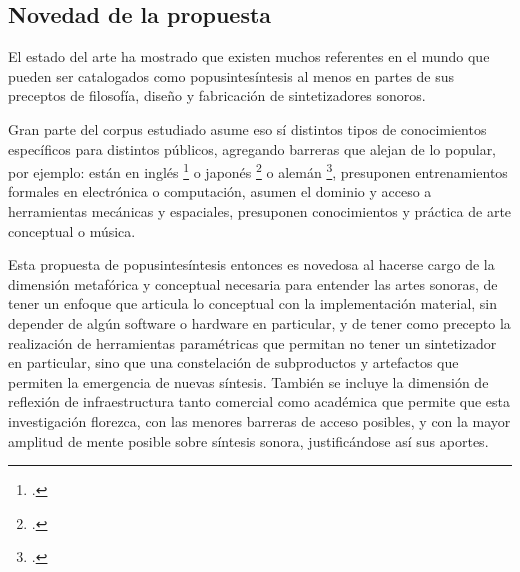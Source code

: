 \documentclass[../candidatura.tex]{subfiles}
\begin{document}
\subsection{Novedad de la propuesta}

El estado del arte ha mostrado que existen muchos referentes en el mundo que pueden ser catalogados como popusintesíntesis al menos en partes de sus preceptos de filosofía, diseño y fabricación de sintetizadores sonoros.

Gran parte del corpus estudiado asume eso sí distintos tipos de conocimientos específicos para distintos públicos, agregando barreras que alejan de lo popular, por ejemplo: están en inglés \footcite{edstrom_arduino_2016} o japonés \footcite{oohashi_strange_2021} o alemán \footcite{kruse_modulare_2024}, presuponen entrenamientos formales en electrónica o computación, asumen el dominio y acceso a herramientas mecánicas y espaciales, presuponen conocimientos y práctica de arte conceptual o música.

Esta propuesta de popusintesíntesis entonces es novedosa al hacerse cargo de la dimensión metafórica y conceptual necesaria para entender las artes sonoras, de tener un enfoque que articula lo conceptual con la implementación material, sin depender de algún software o hardware en particular, y de tener como precepto la realización de herramientas paramétricas que permitan no tener un sintetizador en particular, sino que una constelación de subproductos y artefactos que permiten la emergencia de nuevas síntesis. También se incluye la dimensión de reflexión de infraestructura tanto comercial como académica que permite que esta investigación florezca, con las menores barreras de acceso posibles, y con la mayor amplitud de mente posible sobre síntesis sonora, justificándose así sus aportes.
\end{document}

